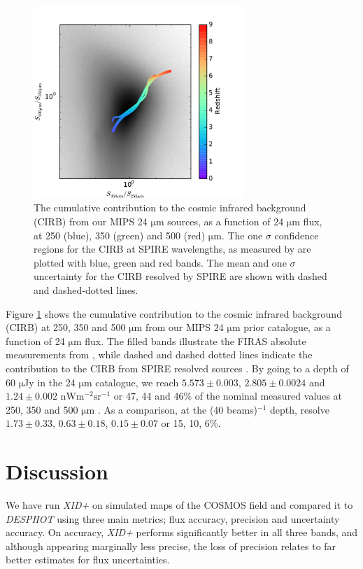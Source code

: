 \documentclass[useAMS,usenatbib]{mnras}
\begin{document}
\begin{figure} 
\includegraphics[width=8cm,page={2}]{colour_colour.pdf}
\caption{The cumulative contribution to the cosmic infrared background (CIRB) from our MIPS 24 $\mathrm{\mu m}$ sources, as a function of 24 $\mathrm{\mu m}$ flux, at 250 (blue), 350 (green) and 500 (red) $\mathrm{\mu m}$. The one $\sigma$ confidence regions for the CIRB at SPIRE wavelengths, as measured by \protect\cite{Lagache:2000} are plotted with blue, green and red bands. The mean and one $\sigma$ uncertainty for the CIRB resolved by SPIRE \protect\citep{Oliver:2010} are shown with dashed and dashed-dotted lines.}\label{fig:cirb}
\end{figure}
Figure \ref{fig:cirb} shows the cumulative contribution to the cosmic infrared background (CIRB) at 250, 350 and 500 $\mathrm{\mu m}$ from our MIPS 24 $\mathrm{\mu m}$ prior catalogue, as a function of 24 $\mathrm{\mu m}$ flux. The filled bands illustrate the FIRAS
absolute measurements from \cite{Lagache:2000}, while dashed and dashed dotted lines indicate the contribution to the CIRB from SPIRE resolved sources \citep{Oliver:2010}. By going to a depth of 60 $\mathrm{\mu}$Jy in the 24 $\mathrm{\mu m}$ catalogue, we reach $5.573\pm0.003$, $2.805\pm0.0024$ and $1.24\pm0.002$ $\mathrm{nWm^{-2}sr^{-1}}$ or 47, 44 and 46\% of the nominal measured values at 250, 350 and 500 $\mathrm{\mu m}$ \citep{Lagache:2000}. As a comparison, at the (40 beams)$^{-1}$ depth, \citep{Oliver:2010} resolve $1.73\pm0.33$, $0.63\pm0.18$, $0.15\pm0.07$ or 15, 10, 6\%.

\section{Discussion}
We have run \emph{XID+} on simulated maps of the COSMOS field and compared it to \emph{DESPHOT} using three main metrics; flux accuracy, precision and uncertainty accuracy. On accuracy, \emph{XID+} performs significantly better in all three bands, and although appearing  marginally less precise, the loss of precision relates to far better estimates for flux uncertainties. 
\end{document}
